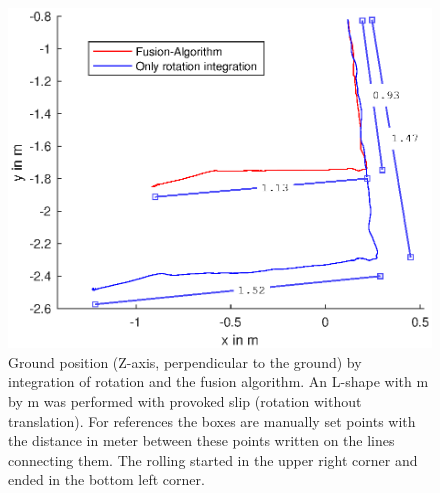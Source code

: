 \documentclass[letterpaper, 10 pt, conference]{ieeeconf}  %
\begin{document}
\begin{figure}
\includegraphics[width=\linewidth]{./graphics/LTest.eps}
\caption{Ground position (Z-axis, perpendicular to the ground) by integration of rotation and the fusion algorithm. An L-shape with \unit[1]{m} by \unit[1]{m} was performed with provoked slip (rotation without translation). For references the boxes are manually set points with the distance in meter between these points written on the lines connecting them. The rolling started in the upper right corner and ended in the bottom left corner. }
\label{LTest}
\end{figure}
\end{document}
